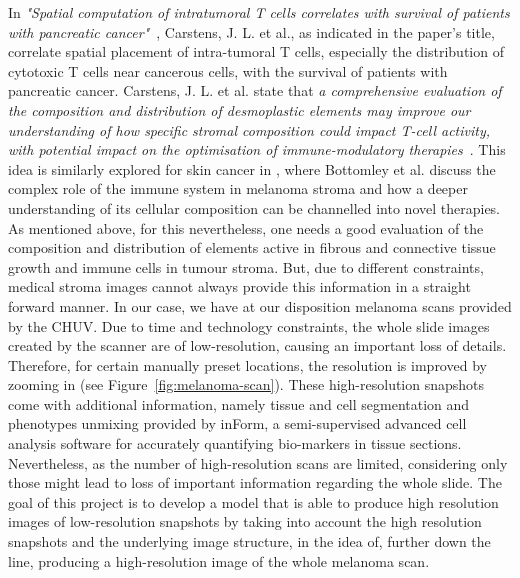 \documentclass[11pt,conference,compsocconf]{IEEEtran}
\begin{document}
In \textit{"Spatial computation of intratumoral T cells correlates with survival of patients with pancreatic cancer"}~\cite{Carstens2017}, Carstens, J. L. et al., as indicated in the paper's title, correlate spatial placement of intra-tumoral T cells, especially the distribution of cytotoxic T cells near cancerous cells, with the survival of patients with pancreatic cancer. Carstens, J. L. et al. state that \textit{a comprehensive evaluation of the composition and distribution of desmoplastic elements may improve our understanding of how specific stromal composition could impact T-cell activity, with potential impact on the optimisation of immune-modulatory therapies}~\cite{Carstens2017}. This idea is similarly explored for skin cancer in \cite{Bottomley2019}, where Bottomley et al. discuss the complex role of the immune system in melanoma stroma and how a deeper understanding of its cellular composition can be channelled into novel therapies. As mentioned above, for this nevertheless, one needs a good evaluation of the composition and distribution of elements active in fibrous and connective tissue growth and immune cells in tumour stroma. But, due to different constraints, medical stroma images cannot always provide this information in a straight forward manner. In our case, we have at our disposition melanoma scans provided by the CHUV. Due to time and technology constraints, the whole slide images created by the scanner are of low-resolution, causing an important loss of details. Therefore, for certain manually preset locations, the resolution is improved by zooming in (see Figure~\ref{fig:melanoma-scan}). These high-resolution snapshots come with additional information, namely tissue and cell segmentation and phenotypes unmixing provided by inForm, a semi-supervised advanced cell analysis software for accurately quantifying bio-markers in tissue sections. Nevertheless, as the number of high-resolution scans are limited, considering only those might lead to loss of important information regarding the whole slide. The goal of this project is to develop a model that is able to produce high resolution images of low-resolution snapshots by taking into account the high resolution snapshots and the underlying image structure, in the idea of, further down the line, producing a high-resolution image of the whole melanoma scan. 
\end{document}
